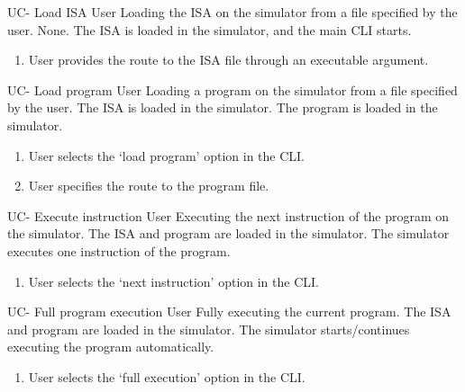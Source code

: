 

\setcounter{i}{1}

\begin{useCase}{UC-}
  {Load \gls{ISA}}  %
  {User}  %
  {Loading the \gls{ISA} on the simulator from a file specified by the user.}  %
  {None.}  %
  {The \gls{ISA} is loaded in the simulator, and the main \gls{CLI} starts.}  %
  \begin{enumerate}[nosep]  %
    \item User provides the route to the \gls{ISA} file through an executable argument.
  \end{enumerate}
\end{useCase}

\begin{useCase}{UC-}
  {Load program}  %
  {User}  %
  {Loading a program on the simulator from a file specified by the user.}  %
  {The \gls{ISA} is loaded in the simulator.}  %
  {The program is loaded in the simulator.}  %
  \begin{enumerate}[nosep]  %
    \item User selects the `load program' option in the \gls{CLI}.
    \item User specifies the route to the program file.
  \end{enumerate}
\end{useCase}

\begin{useCase}{UC-}
  {Execute instruction}  %
  {User}  %
  {Executing the next instruction of the program on the simulator.}  %
  {The \gls{ISA} and program are loaded in the simulator.}  %
  {The simulator executes one instruction of the program.}  %
  \begin{enumerate}[nosep]  %
    \item User selects the `next instruction' option in the \gls{CLI}.
  \end{enumerate}
\end{useCase}

\begin{useCase}{UC-}
  {Full program execution}  %
  {User}  %
  {Fully executing the current program.}  %
  {The \gls{ISA} and program are loaded in the simulator.}  %
  {The simulator starts/continues executing the program automatically.}  %
  \begin{enumerate}[nosep]  %
    \item User selects the `full execution' option in the \gls{CLI}.
  \end{enumerate}
\end{useCase}

